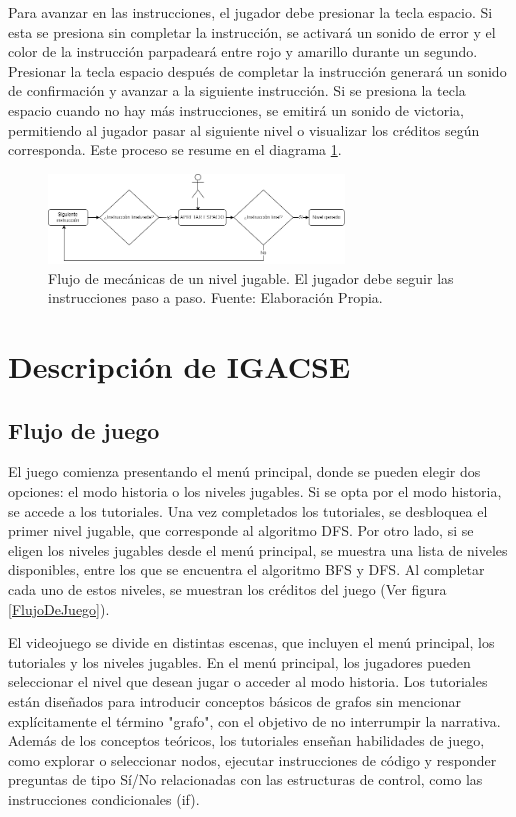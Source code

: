 Para avanzar en las instrucciones, el jugador debe presionar la tecla espacio. Si esta se presiona sin completar la instrucción, se activará un sonido de error y el color de la instrucción parpadeará entre rojo y amarillo durante un segundo. Presionar la tecla espacio después de completar la instrucción generará un sonido de confirmación y avanzar a la siguiente instrucción. Si se presiona la tecla espacio cuando no hay más instrucciones, se emitirá un sonido de victoria, permitiendo al jugador pasar al siguiente nivel o visualizar los créditos según corresponda. Este proceso se resume en el diagrama \ref{FlujoDeMecanicasDeNivel}.

\begin{figure}[h]
	\centering
	\includegraphics[width=0.7\textwidth]{imagenes/FlujoDeMecanicasDeNivel.drawio.png}
	\caption{Flujo de mecánicas de un nivel jugable. El jugador debe seguir las instrucciones paso a paso. Fuente: Elaboración Propia.}
	\label{FlujoDeMecanicasDeNivel}
\end{figure}



\section{Descripción de IGACSE}

\subsection{Flujo de juego}

El juego comienza presentando el menú principal, donde se pueden elegir dos opciones: el modo historia o los niveles jugables. Si se opta por el modo historia, se accede a los tutoriales. Una vez completados los tutoriales, se desbloquea el primer nivel jugable, que corresponde al algoritmo DFS. Por otro lado, si se eligen los niveles jugables desde el menú principal, se muestra una lista de niveles disponibles, entre los que se encuentra el algoritmo BFS y DFS. Al completar cada uno de estos niveles, se muestran los créditos del juego (Ver figura \ref{FlujoDeJuego}).

El videojuego se divide en distintas escenas, que incluyen el menú principal, los tutoriales y los niveles jugables. En el menú principal, los jugadores pueden seleccionar el nivel que desean jugar o acceder al modo historia. Los tutoriales están diseñados para introducir conceptos básicos de grafos sin mencionar explícitamente el término "grafo", con el objetivo de no interrumpir la narrativa. Además de los conceptos teóricos, los tutoriales enseñan habilidades de juego, como explorar o seleccionar nodos, ejecutar instrucciones de código y responder preguntas de tipo Sí/No relacionadas con las estructuras de control, como las instrucciones condicionales (if).


